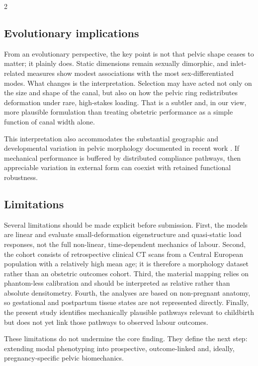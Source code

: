 \documentclass[openacc]{rsproca_new}
\begin{document}
\begin{multicols}{2}
\subsection{Evolutionary implications}

From an evolutionary perspective, the key point is not that pelvic shape ceases to matter; it plainly does. Static dimensions remain sexually dimorphic, and inlet-related measures show modest associations with the most sex-differentiated modes. What changes is the interpretation. Selection may have acted not only on the size and shape of the canal, but also on how the pelvic ring redistributes deformation under rare, high-stakes loading. That is a subtler and, in our view, more plausible formulation than treating obstetric performance as a simple function of canal width alone.

This interpretation also accommodates the substantial geographic and developmental variation in pelvic morphology documented in recent work \cite{BettiManica2018,Novak2020}. If mechanical performance is buffered by distributed compliance pathways, then appreciable variation in external form can coexist with retained functional robustness.

\subsection{Limitations}

Several limitations should be made explicit before submission. First, the models are linear and evaluate small-deformation eigenstructure and quasi-static load responses, not the full non-linear, time-dependent mechanics of labour. Second, the cohort consists of retrospective clinical CT scans from a Central European population with a relatively high mean age; it is therefore a morphology dataset rather than an obstetric outcomes cohort. Third, the material mapping relies on phantom-less calibration and should be interpreted as relative rather than absolute densitometry. Fourth, the analyses are based on non-pregnant anatomy, so gestational and postpartum tissue states are not represented directly. Finally, the present study identifies mechanically plausible pathways relevant to childbirth but does not yet link those pathways to observed labour outcomes.

These limitations do not undermine the core finding. They define the next step: extending modal phenotyping into prospective, outcome-linked and, ideally, pregnancy-specific pelvic biomechanics.


\end{multicols}
\end{document}
